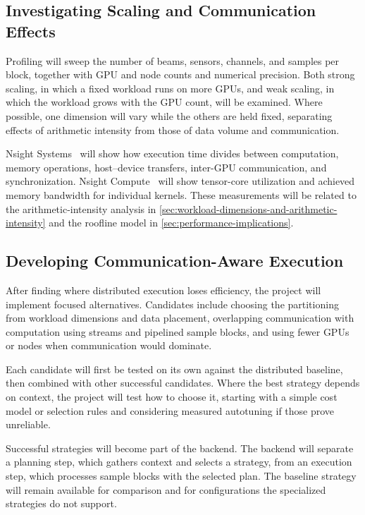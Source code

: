 \subsection{Investigating Scaling and Communication Effects}
\label{sec:investigating-scaling-and-communication-effects}

Profiling will sweep the number of beams, sensors, channels, and samples per block, together with GPU and node counts and numerical precision. Both strong scaling, in which a fixed workload runs on more GPUs, and weak scaling, in which the workload grows with the GPU count, will be examined. Where possible, one dimension will vary while the others are held fixed, separating effects of arithmetic intensity from those of data volume and communication.

Nsight Systems~\cite{nsightSystems} will show how execution time divides between computation, memory operations, host--device transfers, inter-GPU communication, and synchronization. Nsight Compute~\cite{nsightCompute} will show tensor-core utilization and achieved memory bandwidth for individual kernels. These measurements will be related to the arithmetic-intensity analysis in \cref{sec:workload-dimensions-and-arithmetic-intensity} and the roofline model in \cref{sec:performance-implications}.

\subsection{Developing Communication-Aware Execution}
\label{sec:developing-communication-aware-execution}

After finding where distributed execution loses efficiency, the project will implement focused alternatives. Candidates include choosing the partitioning from workload dimensions and data placement, overlapping communication with computation using streams and pipelined sample blocks, and using fewer GPUs or nodes when communication would dominate.

Each candidate will first be tested on its own against the distributed baseline, then combined with other successful candidates. Where the best strategy depends on context, the project will test how to choose it, starting with a simple cost model or selection rules and considering measured autotuning if those prove unreliable.

Successful strategies will become part of the backend. The backend will separate a planning step, which gathers context and selects a strategy, from an execution step, which processes sample blocks with the selected plan. The baseline strategy will remain available for comparison and for configurations the specialized strategies do not support.
